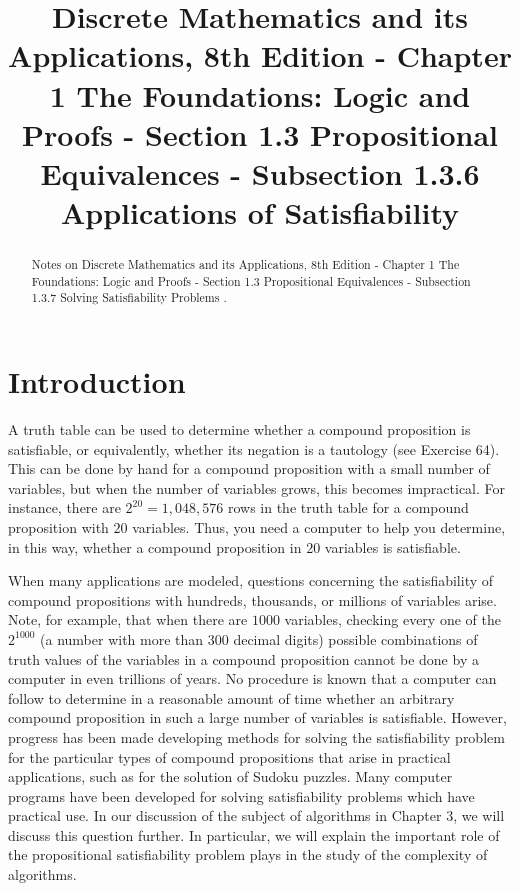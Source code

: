 \documentclass{Axon}
\title{Discrete Mathematics and its Applications, 8th Edition - Chapter 1 The Foundations: Logic and Proofs - Section 1.3 Propositional Equivalences - Subsection 1.3.6 Applications of Satisfiability}
\begin{document}
\maketitle
\makeauthor
\begin{abstract}
Notes on Discrete Mathematics and its Applications, 8th Edition - Chapter 1 The Foundations: Logic and Proofs - Section 1.3 Propositional Equivalences - Subsection 1.3.7 Solving Satisfiability Problems \cite{Rosen}.
\end{abstract}
\section{Introduction}
A truth table can be used to determine whether a compound proposition is satisfiable, or equivalently, whether its negation is a tautology (see Exercise 64). This can be done by hand for a compound proposition with a small number of variables, but when the number of variables grows, this becomes impractical. For instance, there are \(2^{20} = 1,048,576\) rows in the truth table for a compound proposition with \(20\) variables. Thus, you need a computer to help you determine, in this way, whether a compound proposition in \(20\) variables is satisfiable.

When many applications are modeled, questions concerning the satisfiability of compound propositions with hundreds, thousands, or millions of variables arise. Note, for example, that when there are \(1000\) variables, checking every one of the \(2^{1000}\) (a number with more than \(300\) decimal digits) possible combinations of truth values of the variables in a compound proposition cannot be done by a computer in even trillions of years. No procedure is known that a computer can follow to determine in a reasonable amount of time whether an arbitrary compound proposition in such a large number of variables is satisfiable. However, progress has been made developing methods for solving the satisfiability problem for the particular types of compound propositions that arise in practical applications, such as for the solution of Sudoku puzzles. Many computer programs have been developed for solving satisfiability problems which have practical use. In our discussion of the subject of algorithms in Chapter 3, we will discuss this question further. In particular, we will explain the important role of the propositional satisfiability problem plays in the study of the complexity of algorithms.

\printbibliography
\end{document}
